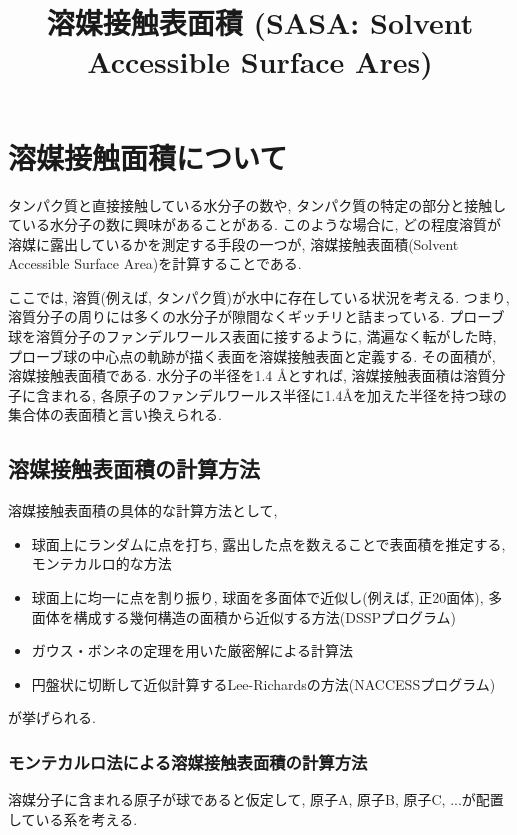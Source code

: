 





\title{溶媒接触表面積 (SASA: Solvent Accessible Surface Ares)}
\maketitle

\section{溶媒接触面積について\cite{2010TohHiroyuki}}
タンパク質と直接接触している水分子の数や, タンパク質の特定の部分と接触している水分子の数に興味があることがある. 
このような場合に, どの程度溶質が溶媒に露出しているかを測定する手段の一つが, 溶媒接触表面積(Solvent Accessible Surface Area)を計算することである. 

ここでは, 溶質(例えば, タンパク質)が水中に存在している状況を考える. つまり, 溶質分子の周りには多くの水分子が隙間なくギッチリと詰まっている. プローブ球を溶質分子のファンデルワールス表面に接するように, 満遍なく転がした時, プローブ球の中心点の軌跡が描く表面を溶媒接触表面と定義する. 
その面積が, 溶媒接触表面積である. 
水分子の半径を1.4 {\AA}とすれば, 溶媒接触表面積は溶質分子に含まれる, 各原子のファンデルワールス半径に1.4{\AA}を加えた半径を持つ球の集合体の表面積と言い換えられる. 


\subsection{溶媒接触表面積の計算方法}
溶媒接触表面積の具体的な計算方法として, 
\begin{itemize}
    \item 球面上にランダムに点を打ち, 露出した点を数えることで表面積を推定する, モンテカルロ的な方法
    \item 球面上に均一に点を割り振り, 球面を多面体で近似し(例えば, 正20面体), 多面体を構成する幾何構造の面積から近似する方法(DSSPプログラム)\cite{1983Kabsch}
    \item ガウス・ボンネの定理を用いた厳密解による計算法
    \item 円盤状に切断して近似計算するLee-Richardsの方法(NACCESSプログラム)\cite{1971Lee}
\end{itemize}

が挙げられる. 

\subsubsection{モンテカルロ法による溶媒接触表面積の計算方法}
溶媒分子に含まれる原子が球であると仮定して, 原子A, 原子B, 原子C, ...が配置している系を考える. 

